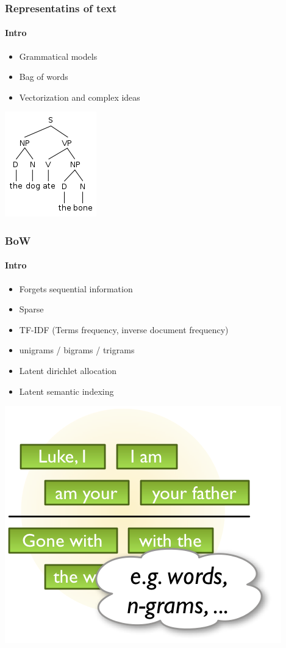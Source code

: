 \documentclass[compress,red]{beamer}
\begin{document}
%
% 
%
\begin{frame}\frametitle{Representatins of text}
\framesubtitle{Intro}
\begin{itemize}
\item Grammatical models
\item Bag of words
\item Vectorization and complex ideas
\end{itemize}
\begin{center}\includegraphics[width=0.3\columnwidth]{engsyntx.png}
\end{center}

\end{frame}

%
%
\begin{frame}\frametitle{BoW}
\framesubtitle{Intro}
\begin{itemize}
\item Forgets sequential information
\item Sparse
\item TF-IDF (Terms frequency, inverse document frequency)
\item unigrams / bigrams / trigrams
\item Latent dirichlet allocation
\item Latent semantic indexing
\end{itemize}
\begin{center}\includegraphics[width=0.4\columnwidth]{sally3.png}
\end{center}
\end{frame}
\end{document}
